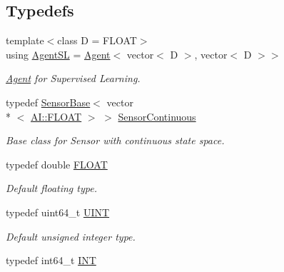 \subsection*{Typedefs}
\begin{DoxyCompactItemize}
\item 
{\footnotesize template$<$class D  = F\+L\+O\+A\+T$>$ }\\using \hyperlink{namespaceAI_acd3da5a0aa6fc3b0e9988d4a6251bdbd}{Agent\+S\+L} = \hyperlink{classAI_1_1Agent}{Agent}$<$ vector$<$ D $>$, vector$<$ D $>$$>$
\begin{DoxyCompactList}\small\item\em \hyperlink{classAI_1_1Agent}{Agent} for Supervised Learning. \end{DoxyCompactList}\item 
\hypertarget{namespaceAI_a7ceaa7caf6e3bf156b8d2ab429d981b8}{typedef \hyperlink{classAI_1_1SensorBase}{Sensor\+Base}$<$ vector\\*
$<$ \hyperlink{namespaceAI_a41b74884a20833db653dded3918e05c3}{A\+I\+::\+F\+L\+O\+A\+T} $>$ $>$ \hyperlink{namespaceAI_a7ceaa7caf6e3bf156b8d2ab429d981b8}{Sensor\+Continuous}}\label{namespaceAI_a7ceaa7caf6e3bf156b8d2ab429d981b8}

\begin{DoxyCompactList}\small\item\em Base class for Sensor with continuous state space. \end{DoxyCompactList}\item 
\hypertarget{namespaceAI_a41b74884a20833db653dded3918e05c3}{typedef double \hyperlink{namespaceAI_a41b74884a20833db653dded3918e05c3}{F\+L\+O\+A\+T}}\label{namespaceAI_a41b74884a20833db653dded3918e05c3}

\begin{DoxyCompactList}\small\item\em Default floating type. \end{DoxyCompactList}\item 
\hypertarget{namespaceAI_ab6e14dc1e659854858a87e511f1439ec}{typedef uint64\+\_\+t \hyperlink{namespaceAI_ab6e14dc1e659854858a87e511f1439ec}{U\+I\+N\+T}}\label{namespaceAI_ab6e14dc1e659854858a87e511f1439ec}

\begin{DoxyCompactList}\small\item\em Default unsigned integer type. \end{DoxyCompactList}\item 
\hypertarget{namespaceAI_ac74584e573f07aa4194b461b1ba7be64}{typedef int64\+\_\+t \hyperlink{namespaceAI_ac74584e573f07aa4194b461b1ba7be64}{I\+N\+T}}\label{namespaceAI_ac74584e573f07aa4194b461b1ba7be64}


\end{DoxyCompactItemize}
